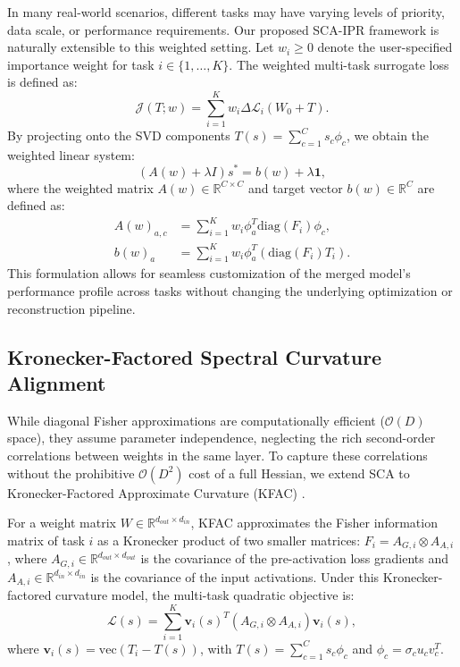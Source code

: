 \documentclass{article}
\theoremstyle{plain}
\theoremstyle{definition}
\theoremstyle{remark}
\begin{document}
In many real-world scenarios, different tasks may have varying levels of priority, data scale, or performance requirements. 
Our proposed SCA-IPR framework is naturally extensible to this weighted setting. 
Let $w_i \ge 0$ denote the user-specified importance weight for task $i \in \{1, \dots, K\}$. 
The weighted multi-task surrogate loss is defined as:
\begin{equation}
    \mathcal{J}(T; w) = \sum_{i=1}^K w_i \Delta \mathcal{L}_i(W_0 + T).
\end{equation}
By projecting onto the SVD components $T(s) = \sum_{c=1}^C s_c \phi_c$, we obtain the weighted linear system:
\begin{equation}
    (A(w) + \lambda I) s^* = b(w) + \lambda \mathbf{1},
\end{equation}
where the weighted matrix $A(w) \in \mathbb{R}^{C \times C}$ and target vector $b(w) \in \mathbb{R}^C$ are defined as:
\begin{align}
    A(w)_{a, c} &= \sum_{i=1}^K w_i \phi_a^T \text{diag}(F_i) \phi_c, \\
    b(w)_a &= \sum_{i=1}^K w_i \phi_a^T \left( \text{diag}(F_i) T_i \right).
\end{align}
This formulation allows for seamless customization of the merged model's performance profile across tasks without changing the underlying optimization or reconstruction pipeline.

\subsection{Kronecker-Factored Spectral Curvature Alignment}
\label{subsec:kfac_sca}

While diagonal Fisher approximations are computationally efficient ($\mathcal{O}(D)$ space), they assume parameter independence, neglecting the rich second-order correlations between weights in the same layer. To capture these correlations without the prohibitive $\mathcal{O}(D^2)$ cost of a full Hessian, we extend SCA to Kronecker-Factored Approximate Curvature (KFAC) \cite{martens2015optimizing}.

For a weight matrix $W \in \mathbb{R}^{d_{out} \times d_{in}}$, KFAC approximates the Fisher information matrix of task $i$ as a Kronecker product of two smaller matrices: $F_i = A_{G,i} \otimes A_{A,i}$, where $A_{G,i} \in \mathbb{R}^{d_{out} \times d_{out}}$ is the covariance of the pre-activation loss gradients and $A_{A,i} \in \mathbb{R}^{d_{in} \times d_{in}}$ is the covariance of the input activations. Under this Kronecker-factored curvature model, the multi-task quadratic objective is:
\begin{equation}
    \mathcal{L}(s) = \sum_{i=1}^K \mathbf{v}_i(s)^T (A_{G,i} \otimes A_{A,i}) \mathbf{v}_i(s),
\end{equation}
where $\mathbf{v}_i(s) = \text{vec}\left(T_i - T(s)\right)$, with $T(s) = \sum_{c=1}^C s_c \phi_c$ and $\phi_c = \sigma_c u_c v_c^T$.
\end{document}
